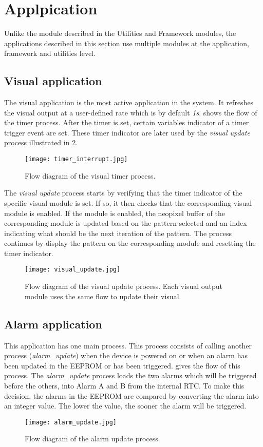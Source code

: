 \section{Applpication}
Unlike the module described in the Utilities and Framework modules, the applications described in this section use multiple modules at the application, framework and utilities level.  

\subsection{Visual application}
The visual application is the most active application in the system. It refreshes the visual output at a user-defined rate which is by default \textit{1s}.  shows the flow of the timer process. After the timer is set, certain variables indicator of a timer trigger event are set. These timer indicator are later used by the \textit{visual update} process illustrated in \cref{fig:visual_update}.
\begin{figure}[ht]
\centering
\texttt{[image: timer\_interrupt.jpg]}
\caption{Flow diagram of the visual timer process.}
\label{fig:timer_interrupt}
\end{figure}
The \textit{visual update} process starts by verifying that the timer indicator of the specific visual module is set. If so, it then checks that the corresponding visual module is enabled. If the module is enabled, the neopixel buffer of the corresponding module is updated based on the pattern selected and an index indicating what should be the next iteration of the pattern. The process continues by display the pattern on the corresponding module and resetting the timer indicator.
\begin{figure}[ht]
\centering
\texttt{[image: visual\_update.jpg]}
\caption{Flow diagram of the visual update process. Each visual output module uses the same flow to update their visual.}
\label{fig:visual_update}
\end{figure}


\subsection{Alarm application}
This application has one main process. This process consists of calling another process (\textit{alarm\_update}) when the device is powered on or when an alarm has been updated in the EEPROM or has been triggered.  gives the flow of this process. The \textit{alarm\_update} process loads the two alarms which will be triggered before the others, into Alarm A and B from the internal RTC. To make this decision, the alarms in the EEPROM are compared by converting the alarm into an integer value. The lower the value, the sooner the alarm will be triggered.
\begin{figure}[h!]
\centering
\texttt{[image: alarm\_update.jpg]}
\caption{Flow diagram of the alarm update process.}
\label{fig:alarm_update}
\end{figure}


